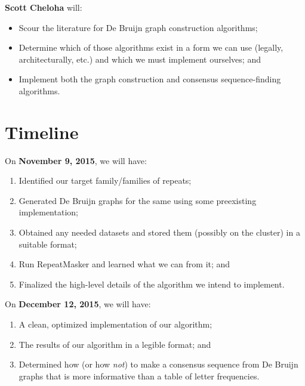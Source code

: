 \documentclass[dvips,12pt]{article}
\begin{document}
\textbf{Scott Cheloha} will:
\begin{itemize}
\item Scour the literature for De Bruijn graph construction algorithms;
\item Determine which of those algorithms exist in a form we can use
  (legally, architecturally, etc.) and which we must implement
  ourselves; and
\item Implement both the graph construction and consensus
  sequence-finding algorithms.
\end{itemize}


\section{Timeline}

On \textbf{November 9, 2015}, we will have:
\begin{enumerate}
\item Identified our target family/families of repeats;
\item Generated De Bruijn graphs for the same using some preexisting
  implementation;
\item Obtained any needed datasets and stored them (possibly on the
  cluster) in a suitable format;
\item Run RepeatMasker and learned what we can from it; and
\item Finalized the high-level details of the algorithm we intend to
  implement.
\end{enumerate}

On \textbf{December 12, 2015}, we will have:
\begin{enumerate}
\item A clean, optimized implementation of our algorithm;
\item The results of our algorithm in a legible format; and
\item Determined how (or how \emph{not}) to make a consensus sequence
  from De Bruijn graphs that is more informative than a table of letter
  frequencies.
\end{enumerate}
\end{document}
